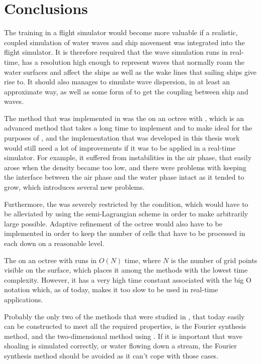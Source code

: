 \chapter{Conclusions}
\label{chap:conclusions}

The training in a flight simulator would become more valuable if a realistic, coupled simulation of water waves and ship movement was integrated into the flight simulator. It is therefore required that the wave simulation runs in real-time, has a resolution high enough to represent waves that normally roam the water surfaces and affect the ships as well as the wake lines that sailing ships give rise to. It should also manages to simulate wave dispersion, in at least an approximate way, as well as some form of \FSI to get the coupling between ship and waves.

The method that was implemented in \thisprojectwork was the \FVM on an octree with \FSM, which is an advanced method that takes a long time to implement and to make ideal for the purposes of \thismasterthesiswork {}\nspace, and the implementation that was developed in this thesis work would still need a lot of improvements if it was to be applied in a real-time simulator. For example, it suffered from instabilities in the air phase, that easily arose when the density became too low, and there were problems with keeping the interface between the air phase and the water phase intact as it tended to grow, which introduces several new problems.

Furthermore, the \timestep was severely restricted by the \CFL condition, which would have to be alleviated by using the semi-Lagrangian scheme in order to make arbitrarily large \timesteps possible. Adaptive refinement of the octree would also have to be implemented in order to keep the number of cells that have to be processed in each \timestep down on a reasonable level.

The \FVM on an octree with \FSM runs in $O(N)$ time, where $N$ is the number of grid points visible on the surface, which places it among the methods with the lowest time complexity. However, it has a very high time constant associated with the big O notation which, as of today, makes it too slow to be used in real-time applications.

Probably the only two of the methods that were studied in \thismasterthesiswork, that today easily can be constructed to meet all the required properties, is the Fourier synthesis method, and the two-dimensional method using \LPD. If it is important that wave shoaling is simulated correctly, or water flowing down a stream, the Fourier synthesis method should be avoided as it can't cope with those cases.

